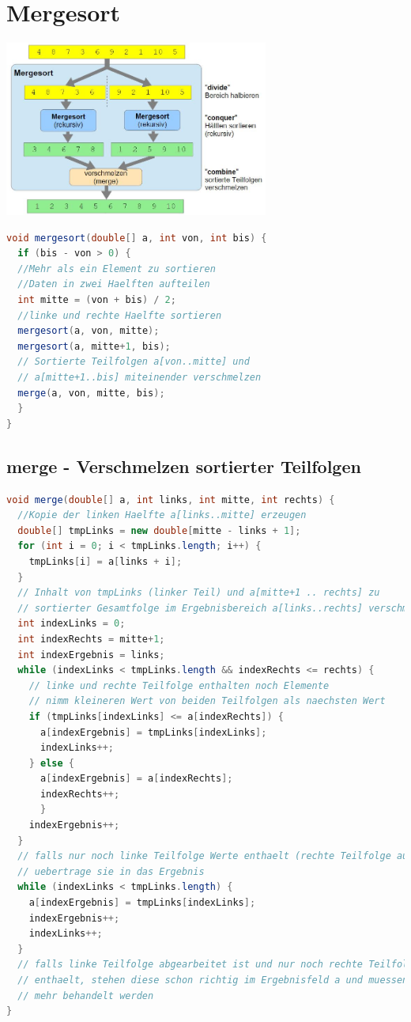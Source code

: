 \documentclass{scrreprt}
\begin{document}
\section{Mergesort}
\includegraphics[width=0.65\textwidth]{graphics/Mergesort}
\\\begin{lstlisting}[language=Java]
void mergesort(double[] a, int von, int bis) {
  if (bis - von > 0) {
  //Mehr als ein Element zu sortieren
  //Daten in zwei Haelften aufteilen
  int mitte = (von + bis) / 2;
  //linke und rechte Haelfte sortieren
  mergesort(a, von, mitte);
  mergesort(a, mitte+1, bis);
  // Sortierte Teilfolgen a[von..mitte] und
  // a[mitte+1..bis] miteinender verschmelzen
  merge(a, von, mitte, bis);
  }
}
\end{lstlisting}
\subsection{merge - Verschmelzen sortierter Teilfolgen}
\begin{lstlisting}[language=Java]
void merge(double[] a, int links, int mitte, int rechts) {
  //Kopie der linken Haelfte a[links..mitte] erzeugen
  double[] tmpLinks = new double[mitte - links + 1];
  for (int i = 0; i < tmpLinks.length; i++) {
    tmpLinks[i] = a[links + i];
  }
  // Inhalt von tmpLinks (linker Teil) und a[mitte+1 .. rechts] zu
  // sortierter Gesamtfolge im Ergebnisbereich a[links..rechts] verschmelzen
  int indexLinks = 0;
  int indexRechts = mitte+1;
  int indexErgebnis = links;
  while (indexLinks < tmpLinks.length && indexRechts <= rechts) {
    // linke und rechte Teilfolge enthalten noch Elemente
    // nimm kleineren Wert von beiden Teilfolgen als naechsten Wert
    if (tmpLinks[indexLinks] <= a[indexRechts]) {
      a[indexErgebnis] = tmpLinks[indexLinks];
      indexLinks++;
    } else {
      a[indexErgebnis] = a[indexRechts];
      indexRechts++;
      }
    indexErgebnis++;
  }
  // falls nur noch linke Teilfolge Werte enthaelt (rechte Teilfolge aufgebraucht),
  // uebertrage sie in das Ergebnis
  while (indexLinks < tmpLinks.length) {
    a[indexErgebnis] = tmpLinks[indexLinks];
    indexErgebnis++;
    indexLinks++;
  }
  // falls linke Teilfolge abgearbeitet ist und nur noch rechte Teilfolge Werte
  // enthaelt, stehen diese schon richtig im Ergebnisfeld a und muessen nicht
  // mehr behandelt werden
}
\end{lstlisting}
\end{document}
